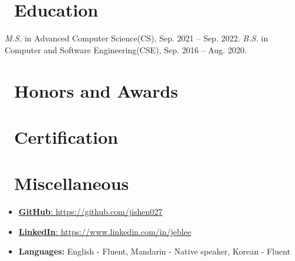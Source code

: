 \documentclass{resume}
\begin{document}
\section{\faGraduationCap\ Education}
\textit{M.S.} in Advanced Computer Science(CS), Sep. 2021 -- Sep. 2022.
\textit{B.S.} in Computer and Software Engineering(CSE), Sep. 2016 -- Aug. 2020.



\section{\faHeartO\ Honors and Awards}

\section{\faCertificate\ Certification}

\section{\faInfo\ Miscellaneous}
\begin{itemize}[parsep=0.5ex]
  \item \href{https://github.com/jishen027}{\textbf{GitHub}: https://github.com/jishen027}
  \item \href{https://www.linkedin.com/in/jeblee}{\textbf{LinkedIn}: https://www.linkedin.com/in/jeblee} 
  \item \textbf{Languages:} English - Fluent, Mandarin - Native speaker, Korean - Fluent
\end{itemize}




%
%
\end{document}
